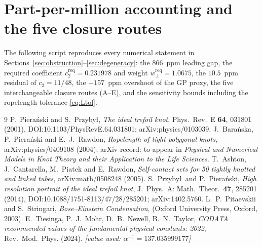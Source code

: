 \documentclass[11pt,a4paper]{article}
\theoremstyle{definition}
\begin{document}
\section{Part-per-million accounting and the five closure routes}
\label{app:audit}
The following script reproduces every numerical statement in
Sections~\ref{sec:obstruction}--\ref{sec:degeneracy}: the $866$~ppm leading gap,
the required coefficient $c_2^{\mathrm{req}}=0.231978$ and weight
$w_\perp^{\mathrm{req}}=1.0675$, the $10.5$~ppm residual of $c_2=11/48$, the
$-157$~ppm overshoot of the GP proxy, the five interchangeable closure routes
(A--E), and the sensitivity bounds including the ropelength tolerance
\eqref{eq:Ltol}.


\begin{thebibliography}{9}
  P.~Piera\'nski and S.~Przyby\l,
  \emph{The ideal trefoil knot},
  Phys.~Rev.~E \textbf{64}, 031801 (2001),
  DOI:10.1103/PhysRevE.64.031801; arXiv:physics/0103039.
  J.~Bara\'nska, P.~Piera\'nski and E.~J.~Rawdon,
  \emph{Ropelength of tight polygonal knots},
  arXiv:physics/0409108 (2004);
  arXiv record: to appear in \emph{Physical and Numerical Models in Knot Theory
  and their Application to the Life Sciences}.
  T.~Ashton, J.~Cantarella, M.~Piatek and E.~Rawdon,
  \emph{Self-contact sets for 50 tightly knotted and linked tubes},
  arXiv:math/0508248 (2005).
  S.~Przyby\l\ and P.~Piera\'nski,
  \emph{High resolution portrait of the ideal trefoil knot},
  J.~Phys.~A: Math.~Theor.~\textbf{47}, 285201 (2014),
  DOI:10.1088/1751-8113/47/28/285201; arXiv:1402.5760.
  L.~P.~Pitaevskii and S.~Stringari,
  \emph{Bose--Einstein Condensation},
  (Oxford University Press, Oxford, 2003).
  E.~Tiesinga, P.~J.~Mohr, D.~B.~Newell, B.~N.~Taylor,
  \emph{CODATA recommended values of the fundamental physical constants: 2022},
  Rev.~Mod.~Phys. (2024). \textit{[value used: $\alpha^{-1}=137.035999177$]}
\end{thebibliography}
\end{document}
